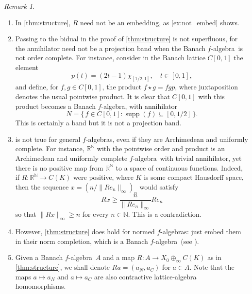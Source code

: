 \documentclass{memo-l}
\theoremstyle{definition}
\theoremstyle{remark}
\newtheorem{rem}[theorem]{Remark}
\numberwithin{section}{chapter}
\numberwithin{equation}{chapter}
\newcommand\N{\ensuremath{\mathbb{N}}}
\newcommand\R{\ensuremath{\mathbb{R}}}
\newcommand{\falg}{$f\!$-algebra}
\DeclareMathOperator{\supp}{supp}
\begin{document}
\begin{rem}
    \begin{enumerate}
        \item In \cref{thm:structure}, $R$ need not be an
            embedding, as \cref{ex:not_embed} shows.
        \item Passing to the bidual in the proof of \cref{thm:structure} is not
            superfluous, for the annihilator need not be a projection
            band when the Banach \falg\ is not order complete. For instance, consider in the Banach lattice
            $C[0,1]$ the element
            \[
                p(t)=(2t-1) \chi _{[1/2,1]},\quad t \in [0,1],
            \]
            and define, for $f,g \in C[0,1]$, the product $f\star
            g=fgp$, where juxtaposition denotes the usual pointwise
            product. It is clear that $C[0,1]$ with this product
            becomes a Banach \falg, with annihilator
            \[
                N=\{\, f \in C[0,1] : \supp(f)\subseteq [0,1/2] \, \}.
            \]
            This is certainly a band but it is
            not a projection band.
        \item {} is not true for general \falg s, even
            if they are Archimedean and
            uniformly complete. For instance, $\R^{\N}$ with the
            pointwise order and product is an Archimedean and
            uniformly complete \falg\ with trivial annihilator, yet
            there is no positive map from $\R^{\N}$ to a
            space of continuous functions. Indeed, if $R\colon
            \R^{\N}\to C(K)$ were positive, where $K$ is some compact
            Hausdorff space, then
            the sequence $x=(n/\|Re_n\|_\infty )_n$ would satisfy
            \[
            Rx\ge \frac{n}{\|Re_n\|_\infty } Re_n
            \]
            so that $\|Rx\|_\infty \ge n$ for every $n \in \N$. This
            is a contradiction.
        \item However, \cref{thm:structure} does hold for normed
            \falg s: just embed them in their norm completion, which
            is a Banach \falg\ (see \cite[Proposition
            2.1]{jaber2020}).
        \item Given a Banach \falg\ $A$ and a map $R\colon A\to X_0\oplus_\infty
        C(K)$ as in \cref{thm:structure}, we shall denote $Ra=(a_N,a_C)$ for
        $a \in A$. Note that the maps $a\mapsto a_N$ and $a\mapsto a_C$ are
        also contractive lattice-algebra homomorphisms.
    \end{enumerate}
\end{rem}
\end{document}
